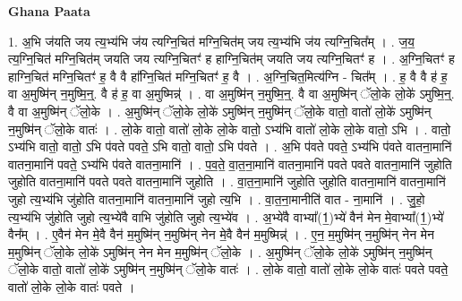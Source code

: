 \documentclass[17pt]{extarticle}
\begin{document}
\textbf{Ghana Paata } \newline

1. अ॒भि ज॑यति जय त्य॒भ्य॑भि ज॑य त्यग्नि॒चित॑ मग्नि॒चित॑म् जय त्य॒भ्य॑भि ज॑य त्यग्नि॒चित᳚म् । . ज॒य॒ त्य॒ग्नि॒चित॑ मग्नि॒चित॑म् जयति जय त्यग्नि॒चितꣳ॑ ह हाग्नि॒चित॑म् जयति जय त्यग्नि॒चितꣳ॑ ह । . अ॒ग्नि॒चितꣳ॑ ह हाग्नि॒चित॑ मग्नि॒चितꣳ॑ ह॒ वै वै हा᳚ग्नि॒चित॑ मग्नि॒चितꣳ॑ ह॒ वै । . अ॒ग्नि॒चित॒मित्य॑ग्नि - चित᳚म् । . ह॒ वै वै ह॑ ह॒ वा अ॒मुष्मि॑न् न॒मुष्मि॒न्॒. वै ह॑ ह॒ वा अ॒मुष्मिन्न्॑ । . वा अ॒मुष्मि॑न् न॒मुष्मि॒न्॒. वै वा अ॒मुष्मि॑न् ॅलो॒के लो॒के॑ ऽमुष्मि॒न्॒. वै वा अ॒मुष्मि॑न् ॅलो॒के । . अ॒मुष्मि॑न् ॅलो॒के लो॒के॑ ऽमुष्मि॑न् न॒मुष्मि॑न् ॅलो॒के वातो॒ वातो॑ लो॒के॑ ऽमुष्मि॑न् न॒मुष्मि॑न् ॅलो॒के वातः॑ । . लो॒के वातो॒ वातो॑ लो॒के लो॒के वातो॒ ऽभ्य॑भि वातो॑ लो॒के लो॒के वातो॒ ऽभि । . वातो॒ ऽभ्य॑भि वातो॒ वातो॒ ऽभि प॑वते पवते॒ ऽभि वातो॒ वातो॒ ऽभि प॑वते । . अ॒भि प॑वते पवते॒ ऽभ्य॑भि प॑वते वातना॒मानि॑ वातना॒मानि॑ पवते॒ ऽभ्य॑भि प॑वते वातना॒मानि॑ । . प॒व॒ते॒ वा॒त॒ना॒मानि॑ वातना॒मानि॑ पवते पवते वातना॒मानि॑ जुहोति जुहोति वातना॒मानि॑ पवते पवते वातना॒मानि॑ जुहोति । . वा॒त॒ना॒मानि॑ जुहोति जुहोति वातना॒मानि॑ वातना॒मानि॑ जुहो त्य॒भ्य॑भि जु॑होति वातना॒मानि॑ वातना॒मानि॑ जुहो त्य॒भि । . वा॒त॒ना॒मानीति॑ वात - ना॒मानि॑ । . जु॒हो॒ त्य॒भ्य॑भि जु॑होति जुहो त्य॒भ्ये॑वै वाभि जु॑होति जुहो त्य॒भ्ये॑व । . अ॒भ्ये॑वै वाभ्या᳚(1॒)भ्ये॑ वैन॑ मेन मे॒वाभ्या᳚(1॒)भ्ये॑ वैन᳚म् । . ए॒वैन॑ मेन मे॒वै वैन॑ म॒मुष्मि॑न् न॒मुष्मि॑न् नेन मे॒वै वैन॑ म॒मुष्मिन्न्॑ । . ए॒न॒ म॒मुष्मि॑न् न॒मुष्मि॑न् नेन मेन म॒मुष्मि॑न् ॅलो॒के लो॒के॑ ऽमुष्मि॑न् नेन मेन म॒मुष्मि॑न् ॅलो॒के । . अ॒मुष्मि॑न् ॅलो॒के लो॒के॑ ऽमुष्मि॑न् न॒मुष्मि॑न् ॅलो॒के वातो॒ वातो॑ लो॒के॑ ऽमुष्मि॑न् न॒मुष्मि॑न् ॅलो॒के वातः॑ । . लो॒के वातो॒ वातो॑ लो॒के लो॒के वातः॑ पवते पवते॒ वातो॑ लो॒के लो॒के वातः॑ पवते । \newline
\end{document}
